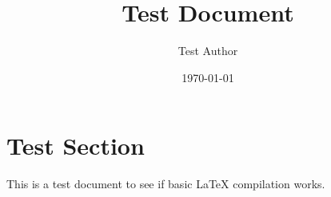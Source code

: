 \documentclass[12pt]{article}
\begin{document}
\title{Test Document}
\author{Test Author}
\date{\today}
\maketitle

\section{Test Section}
This is a test document to see if basic LaTeX compilation works.
\end{document}

